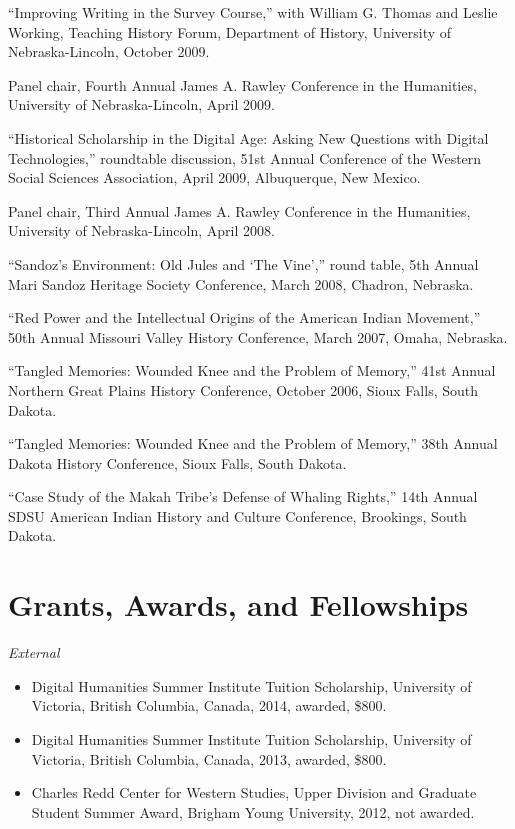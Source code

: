 ``Improving Writing in the Survey Course,'' with William G. Thomas and
Leslie Working, Teaching History Forum, Department of History,
University of Nebraska-Lincoln, October 2009.

Panel chair, Fourth Annual James A. Rawley Conference in the Humanities,
University of Nebraska-Lincoln, April 2009.

``Historical Scholarship in the Digital Age: Asking New Questions with
Digital Technologies,'' roundtable discussion, 51st Annual Conference of
the Western Social Sciences Association, April 2009, Albuquerque, New
Mexico.

Panel chair, Third Annual James A. Rawley Conference in the Humanities,
University of Nebraska-Lincoln, April 2008.

``Sandoz's Environment: Old Jules and `The Vine','' round table, 5th
Annual Mari Sandoz Heritage Society Conference, March 2008, Chadron,
Nebraska.

``Red Power and the Intellectual Origins of the American Indian
Movement,'' 50th Annual Missouri Valley History Conference, March 2007,
Omaha, Nebraska.

``Tangled Memories: Wounded Knee and the Problem of Memory,'' 41st
Annual Northern Great Plains History Conference, October 2006, Sioux
Falls, South Dakota.

``Tangled Memories: Wounded Knee and the Problem of Memory,'' 38th
Annual Dakota History Conference, Sioux Falls, South Dakota.

``Case Study of the Makah Tribe's Defense of Whaling Rights,'' 14th
Annual SDSU American Indian History and Culture Conference, Brookings,
South Dakota.

\newpage

\section{Grants, Awards, and
Fellowships}\label{grants-awards-and-fellowships}

\emph{External}

\begin{itemize}
\tightlist
\item
  Digital Humanities Summer Institute Tuition Scholarship, University of
  Victoria, British Columbia, Canada, 2014, awarded, \$800.
\item
  Digital Humanities Summer Institute Tuition Scholarship, University of
  Victoria, British Columbia, Canada, 2013, awarded, \$800.
\item
  Charles Redd Center for Western Studies, Upper Division and Graduate
  Student Summer Award, Brigham Young University, 2012, not awarded.
\end{itemize}

